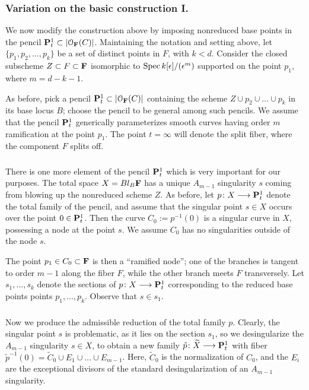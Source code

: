 \documentclass[reqno, 10 pt]{article}
\theoremstyle{definition}
\theoremstyle{remark}
\numberwithin{equation}{section}
\numberwithin{thm}{section}
\numberwithin{prop}{section}
\numberwithin{lem}{section}
\numberwithin{cor}{section}
\numberwithin{conj}{section}
\numberwithin{defn}{section}
\newcommand{\F}{{\mathbf F}}
\renewcommand{\to}{\longrightarrow}
\newcommand{\cO}{{\mathcal O}}
\renewcommand{\P}{{\bf P}}
\renewcommand{\F}{{\bf F}}
\newcommand {\from}{{\colon}}
\newcommand{\Spec}{{\text{\rm Spec}\,}}
\begin{document}
  \subsubsection{Variation on the basic construction I.}\label{modified} 

    We now modify the construction above by imposing nonreduced base points in the pencil $\P^{1}_{t} \subset |\cO_{\F}(C)|$. Maintaining the notation and setting above, let $\{p_{1}, p_{2}, ... ,p_{k}\}$  be a set of distinct points in $F$, with $k < d$.  Consider the closed subscheme $Z \subset F \subset \F$ isomorphic to $\Spec k[\epsilon]/(\epsilon^{m})$ supported on the point $p_1$, where $m = d-k-1$. 
 
    As before, pick a pencil $\P^{1}_{t} \subset |\cO_{\F}(C)|$ containing the scheme $Z \cup p_{2} \cup ... \cup p_{k}$ in its base locus $B$; choose the pencil to be general among such pencils.  We assume that the pencil $\P^1_{t}$ generically parameterizes smooth curves having order $m$ ramification at the point $p_{1}$. The point $t = \infty$ will denote the split fiber, where the component $F$ splits off.

  \subsubsection{}    
     There is one more element of the pencil $\P^{1}_{t}$ which is very important for our purposes. The total space $X = Bl_{B} \F$ has a unique $A_{m-1}$ singularity $s$ coming from blowing up the nonreduced scheme $Z$. As before, let $p \from X \to \P^{1}_{t}$ denote the total family of the pencil, and assume that the singular point $s \in X$ occurs over the point $0 \in \P^{1}_{t}$. Then the curve $C_{0} := p^{-1}(0)$ is a singular curve in $X$, possessing a node at the point $s$. We assume $C_{0}$ has no singularities outside of the node $s$. 

     The point $p_{1} \in C_{0} \subset \F$ is then a ``ramified node''; one of the branches is tangent to order $m-1$ along the fiber $F$, while the other branch meets $F$ transversely.  Let $s_{1}, ... , s_{k}$ denote the sections of $p \from X \to \P^{1}_{t}$ corresponding to the reduced base points points $p_{1}, ... ,p_{k}$. Observe that $s \in s_{1}$.

  \subsubsection{}   
     Now we produce the admissible reduction of the total family $p$.  Clearly, the singular point $s$ is problematic, as it lies on the section $s_{1}$,  so we desingularize the $A_{m-1}$ singularity $s \in X$, to obtain a new family $\tilde{p} \from \widetilde{X} \to \P^1_{t}$ with fiber $\tilde{p}^{-1}(0) = \widetilde{C}_{0} \cup E_{1} \cup ... \cup E_{m-1}$.  Here, $\widetilde{C}_{0}$ is the normalization of $C_{0}$, and the $E_{i}$ are the exceptional divisors of the standard desingularization of an $A_{m-1}$ singularity. 
     
\end{document}
